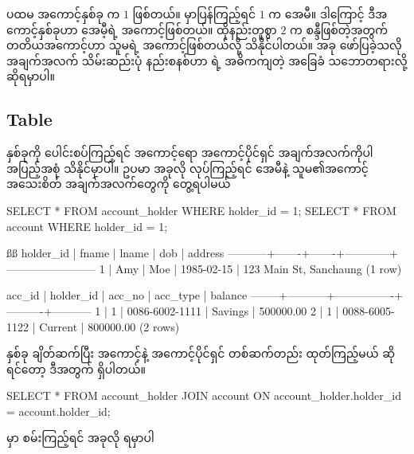 ပထမ အကောင့်နှစ်ခု  က $1$ ဖြစ်တယ်။   မှာပြန်ကြည့်ရင်  $1$ က အေမီ။ ဒါကြောင့် ဒီအကောင့်နှစ်ခုဟာ အေမီ့ရဲ့ အကောင့်ဖြစ်တယ်။ ထိုနည်းတူစွာ  $2$ က စန္ဒီဖြစ်တဲ့အတွက် တတိယအကောင့်ဟာ သူမရဲ့ အကောင့်ဖြစ်တယ်လို့ သိနိုင်ပါတယ်။ အခု ဖော်ပြခဲ့သလို အချက်အလက် သိမ်းဆည်းပုံ နည်းစနစ်ဟာ  ရဲ့ အဓိကကျတဲ့ အခြေခံ သဘောတရားလို့ ဆိုရမှာပါ။

\subsection*{Table }
 နှစ်ခုကို ပေါင်းစပ်ကြည့်ရင် အကောင့်ရော အကောင့်ပိုင်ရှင် အချက်အလက်ကိုပါ အပြည့်အစုံ သိနိုင်မှာပါ။ ဥပမာ အခုလို  လုပ်ကြည့်ရင် အေမီနဲ့ သူမ၏အကောင့် အသေးစိတ် အချက်အလက်တွေကို တွေ့ရပါမယ်
%
\begin{sql}
SELECT * FROM account_holder WHERE holder_id = 1;
SELECT * FROM account WHERE holder_id = 1;
\end{sql}
%
\begin{vbtm}
ßß
 holder_id | fname | lname |    dob     |        address
-----------+-------+-------+------------+------------------------
         1 | Amy   | Moe   | 1985-02-15 | 123 Main St, Sanchaung
(1 row)


 acc_id | holder_id |     acc_no     | acc_type |  balance
--------+-----------+----------------+----------+-----------
      1 |         1 | 0086-6002-1111 | Savings  | 500000.00
      2 |         1 | 0088-6005-1122 | Current  | 800000.00
(2 rows)
\end{vbtm}

 နှစ်ခု ချိတ်ဆက်ပြီး အကောင့်နဲ့ အကောင့်ပိုင်ရှင် တစ်ဆက်တည်း ထုတ်ကြည့်မယ် ဆိုရင်တော့ ဒီအတွက်   ရှိပါတယ်။
%
\begin{sql}
SELECT * FROM account_holder JOIN account
ON account_holder.holder_id = account.holder_id;
\end{sql}
%
 မှာ စမ်းကြည့်ရင် အခုလို ရမှာပါ

